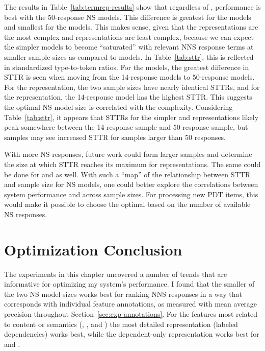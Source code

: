 The results in Table~\ref{tab:termrep-results} show that regardless of , performance is best with the 50-response NS models. This difference is greatest for the  models and smallest for the  models. This makes sense, given that the  representations are the most complex and  representations are least complex, because we can expect the simpler  models to become ``saturated'' with relevant NNS response terms at smaller sample sizes as compared to  models. In Table~\ref{tab:sttr}, this is reflected in standardized type-to-token ratios. For the  models, the greatest difference in STTR is seen when moving from the  14-response models to 50-response models. For the  representation, the two sample sizes have nearly identical STTRs, and for the  representation, the 14-response model has the highest STTR. This suggests the optimal NS model size is correlated with the complexity. Considering Table~\ref{tab:sttr}, it appears that STTRs for the simpler  and   representations likely peak somewhere between the 14-response sample and 50-response sample, but  samples may see increased STTR for samples larger than 50 responses.

With more NS responses, future work could form larger samples and determine the size at which STTR reaches its maximum for  representations. The same could be done for  and   as well. With such a ``map'' of the relationship between STTR and sample size for NS models, one could better explore the correlations between system performance and  across sample sizes. For processing new PDT items, this would make it possible to choose the optimal  based on the number of available NS responses.



\section{Optimization Conclusion}
\label{sec:optimization-conclusion}
The experiments in this chapter uncovered a number of trends that are informative for optimizing my system's performance. I found that the smaller of the two NS model sizes works best for ranking NNS responses in a way that corresponds with individual feature annotations, as measured with mean average precision throughout Section~\ref{sec:exp-annotations}. For the features most related to content or semantics (, , and ) the most detailed representation (labeled dependencies) works best, while the dependent-only representation works best for  and .

